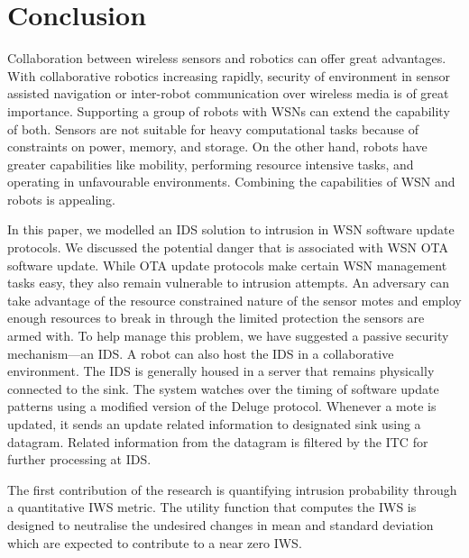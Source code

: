 \documentclass[conference,final]{IEEEtran}
\begin{document}
\section{Conclusion}
\label{sec:concl}

Collaboration between wireless sensors and robotics can offer great advantages. 
With collaborative robotics increasing rapidly, security of environment in sensor assisted navigation or inter-robot communication over wireless media is of great importance.
Supporting a group of robots with WSNs  can extend the capability of both. 
Sensors are not suitable for heavy computational tasks because of constraints on power, memory, and storage. 
On the other hand, robots have greater capabilities like mobility, performing resource intensive tasks, and operating in unfavourable
environments.
Combining the capabilities of WSN and robots is appealing. 


In this paper, we modelled an IDS solution to intrusion in WSN software update protocols.
We discussed the potential danger that is associated with WSN OTA software update.
While OTA update protocols make certain WSN management tasks easy, they also remain vulnerable to intrusion attempts.
An adversary can take advantage of the resource constrained nature of the sensor motes and employ enough resources to break in through the limited protection the sensors are armed with.
To help manage this problem, we have suggested a passive security mechanism---an IDS.
A robot can also host the IDS in a collaborative environment.
The IDS is generally housed in a server that remains physically connected to the  sink. 
The system watches over the timing of software update patterns using a modified version of the Deluge protocol.
Whenever a mote is updated, it sends an update related information to designated sink using a datagram.  
Related information from the datagram is filtered by the ITC for further processing at IDS.

The first contribution of the research is quantifying intrusion probability through a quantitative IWS metric. 
The utility function that computes the IWS is designed to neutralise the undesired %
changes in mean and standard deviation which are expected to contribute to a near zero IWS.%
\end{document}
